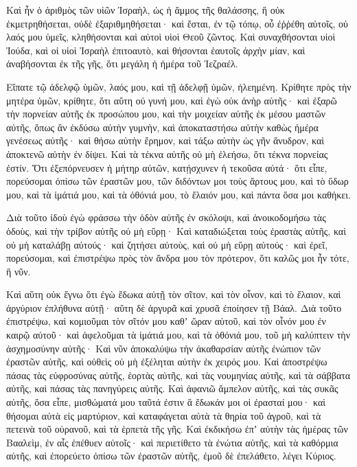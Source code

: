 {Καὶ ἦν ὁ ἀριθμὸς τῶν υἱῶν Ἰσραὴλ, ὡς ἡ ἄμμος τῆς θαλάσσης, ἣ οὐκ ἐκμετρηθήσεται, οὐδὲ ἐξαριθμηθήσεται· καὶ ἔσται, ἐν τῷ τόπῳ, οὗ ἐῤῥέθη αὐτοῖς, οὐ λαός μου ὑμεῖς, κληθήσονται καὶ αὐτοὶ υἱοὶ Θεοῦ ζῶντος.
Καὶ συναχθήσονται υἱοὶ Ἰούδα, καὶ οἱ υἱοὶ Ἰσραὴλ ἐπιτοαυτὸ, καὶ θήσονται ἑαυτοῖς ἀρχὴν μίαν, καὶ ἀναβήσονται ἐκ τῆς γῆς, ὅτι μεγάλη ἡ ἡμέρα τοῦ Ἰεζραέλ.
\par }{\PP {}Εἴπατε τῷ ἀδελφῷ ὑμῶν, λαός μου, καὶ τῇ ἀδελφῇ ὑμῶν, ἠλεημένη.
Κρίθητε πρὸς τὴν μητέρα ὑμῶν, κρίθητε, ὅτι αὕτη οὐ γυνή μου, καὶ ἐγὼ οὐκ ἀνὴρ αὐτῆς· καὶ ἐξαρῶ τὴν πορνείαν αὐτῆς ἐκ προσώπου μου, καὶ τὴν μοιχείαν αὐτῆς ἐκ μέσου μαστῶν αὐτῆς,
ὅπως ἂν ἐκδύσω αὐτὴν γυμνὴν, καὶ ἀποκαταστήσω αὐτὴν καθὼς ἡμέρα γενέσεως αὐτῆς· καὶ θήσω αὐτὴν ἔρημον, καὶ τάξω αὐτὴν ὡς γῆν ἄνυδρον, καὶ ἀποκτενῶ αὐτὴν ἐν δίψει.
Καὶ τὰ τέκνα αὐτῆς οὐ μὴ ἐλεήσω, ὅτι τέκνα πορνείας ἐστίν.
Ὅτι ἐξεπόρνευσεν ἡ μήτηρ αὐτῶν, κατῄσχυνεν ἡ τεκοῦσα αὐτά· ὅτι εἶπε, πορεύσομαι ὀπίσω τῶν ἐραστῶν μου, τῶν διδόντων μοι τοὺς ἄρτους μου, καὶ τὸ ὕδωρ μου, καὶ τὰ ἱμάτιά μου, καὶ τὰ ὀθόνιά μου, τὸ ἔλαιόν μου, καὶ πάντα ὅσα μοι καθήκει.
\par }{\PP {}Διὰ τοῦτο ἰδοὺ ἐγὼ φράσσω τὴν ὁδὸν αὐτῆς ἐν σκόλοψι, καὶ ἀνοικοδομήσω τὰς ὁδοὺς, καὶ τὴν τρίβον αὐτῆς οὐ μὴ εὕρῃ·
Καὶ καταδιώξεται τοὺς ἐραστὰς αὐτῆς, καὶ οὐ μὴ καταλάβῃ αὐτούς· καὶ ζητήσει αὐτοὺς, καὶ οὐ μὴ εὕρῃ αὐτούς· καὶ ἐρεῖ, πορεύσομαι, καὶ ἐπιστρέψω πρὸς τὸν ἄνδρα μου τὸν πρότερον, ὅτι καλῶς μοι ἦν τότε, ἢ νῦν.
\par }{\PP {}Καὶ αὕτη οὐκ ἔγνω ὅτι ἐγὼ ἔδωκα αὐτῇ τὸν σῖτον, καὶ τὸν οἶνον, καὶ τὸ ἔλαιον, καὶ ἀργύριον ἐπλήθυνα αὐτῇ· αὕτη δὲ ἀργυρᾶ καὶ χρυσᾶ ἐποίησεν τῇ Βάαλ.
Διὰ τοῦτο ἐπιστρέψω, καὶ κομιοῦμαι τὸν σῖτόν μου καθʼ ὥραν αὐτοῦ, καὶ τὸν οἶνόν μου ἐν καιρῷ αὐτοῦ· καὶ ἀφελοῦμαι τὰ ἱμάτιά μου, καὶ τὰ ὀθόνιά μου, τοῦ μὴ καλύπτειν τὴν ἀσχημοσύνην αὐτῆς·
Καὶ νῦν ἀποκαλύψω τὴν ἀκαθαρσίαν αὐτῆς ἐνώπιον τῶν ἐραστῶν αὐτῆς, καὶ οὐθεὶς οὐ μὴ ἐξέληται αὐτὴν ἐκ χειρός μου.
Καὶ ἀποστρέψω πάσας τὰς εὐφροσύνας αὐτῆς, ἑορτὰς αὐτῆς, καὶ τὰς νουμηνίας αὐτῆς, καὶ τὰ σάββατα αὐτῆς, καὶ πάσας τὰς πανηγύρεις αὐτῆς.
Καὶ ἀφανιῶ ἄμπελον αὐτῆς, καὶ τὰς συκᾶς αὐτῆς, ὅσα εἶπε, μισθώματά μου ταῦτά ἐστιν ἃ ἔδωκάν μοι οἱ ἐρασταί μου· καὶ θήσομαι αὐτὰ εἰς μαρτύριον, καὶ καταφάγεται αὐτὰ τὰ θηρία τοῦ ἀγροῦ, καὶ τὰ πετεινὰ τοῦ οὐρανοῦ, καὶ τὰ ἑρπετὰ τῆς γῆς.
Καὶ ἐκδικήσω ἐπʼ αὐτὴν τὰς ἡμέρας τῶν Βααλεὶμ, ἐν αἷς ἐπέθυεν αὐτοῖς· καὶ περιετίθετο τὰ ἐνώτια αὐτῆς, καὶ τὰ καθόρμια αὐτῆς, καὶ ἐπορεύετο ὀπίσω τῶν ἐραστῶν αὐτῆς, ἐμοῦ δὲ ἐπελάθετο, λέγει Κύριος.
}
